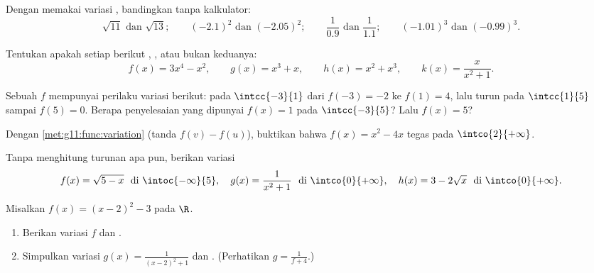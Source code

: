 \begin{exercise}[$\star$]\label{exo:g11:func:2}
Dengan memakai variasi , bandingkan tanpa
kalkulator:
\[
\sqrt{11} \text{ dan } \sqrt{13}; \qquad
(-2.1)^2 \text{ dan } (-2.05)^2; \qquad
\frac{1}{0.9} \text{ dan } \frac{1}{1.1}; \qquad
(-1.01)^3 \text{ dan } (-0.99)^3 .
\]
\end{exercise}

\begin{exercise}[$\star$]\label{exo:g11:func:3}
Tentukan apakah setiap  berikut , , atau bukan keduanya:
\[
f(x) = 3x^4 - x^2, \qquad
g(x) = x^3 + x, \qquad
h(x) = x^2 + x^3, \qquad
k(x) = \frac{x}{x^2+1} .
\]
\end{exercise}

\begin{exercise}[$\star$]\label{exo:g11:func:4}
Sebuah  $f$ mempunyai perilaku variasi berikut:  pada
$\intcc{-3}{1}$ dari $f(-3) = -2$ ke $f(1) = 4$, lalu turun pada
$\intcc{1}{5}$ sampai $f(5) = 0$. Berapa penyelesaian yang dipunyai 
$f(x) = 1$ pada $\intcc{-3}{5}$? Lalu $f(x) = 5$?
\end{exercise}

\begin{exercise}[$\star\star$]\label{exo:g11:func:5}
Dengan \cref{met:g11:func:variation} (tanda $f(v) - f(u)$), buktikan bahwa
$f(x) = x^2 - 4x$ tegas  pada $\intco{2}{+\infty}$.
\end{exercise}

\begin{exercise}[$\star\star$]\label{exo:g11:func:6}
Tanpa menghitung turunan apa pun, berikan variasi
\[
f(x) = \sqrt{5 - x} \ \text{ di } \intoc{-\infty}{5},
\quad
g(x) = \frac{1}{x^2 + 1} \ \text{ di } \intco{0}{+\infty},
\quad
h(x) = 3 - 2\sqrt{x} \ \text{ di } \intco{0}{+\infty}.
\]
\end{exercise}

\begin{exercise}[$\star\star$]\label{exo:g11:func:7}
Misalkan $f(x) = (x-2)^2 - 3$ pada $\R$.
\begin{enumerate}
  \item Berikan variasi $f$ dan .
  \item Simpulkan variasi $g(x) = \frac{1}{(x-2)^2+1}$ dan
        . (Perhatikan $g = \frac{1}{f + 4}$.)
\end{enumerate}
\end{exercise}

